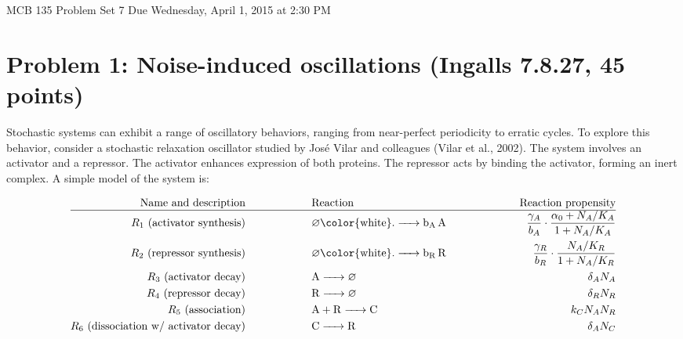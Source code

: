 \documentclass{article}
\begin{document}
\large

MCB 135 Problem Set 7 \hfill Due Wednesday, April 1, 2015 at 2:30 PM

\section*{Problem 1: Noise-induced oscillations (Ingalls 7.8.27, 45 points)}

Stochastic systems can exhibit a range of oscillatory behaviors, ranging from near-perfect periodicity to erratic cycles. To explore this behavior, consider a stochastic relaxation oscillator studied by Jos\'{e} Vilar and colleagues (Vilar et al., 2002). The system involves an activator and a repressor. The activator enhances expression of both proteins. The repressor acts by binding the activator, forming an inert complex. A simple model of the system is:

\begin{eqnarray*}
\textrm{ Name and description } \hspace{2 cm} & \textrm{Reaction} & \hspace{2 cm} \textrm{Reaction propensity}\\ \hline
R_1 \textrm{ (activator synthesis) } \hspace{2 cm} & \ce{\varnothing {\color{white}.} -> b_A A} & \hspace{2 cm} \frac{\gamma_A}{b_A} \cdot \frac{\alpha_0 + N_A/K_A}{1 + N_A/K_A}\\
R_2 \textrm{ (repressor synthesis) } \hspace{2 cm} & \ce{\varnothing {\color{white}.} -> b_R R} & \hspace{2 cm} \frac{\gamma_R}{b_R} \cdot \frac{N_A/K_R}{1 + N_A/K_R}\\
R_3 \textrm{ (activator decay) } \hspace{2 cm} & \ce{A -> \varnothing} & \hspace{2 cm} \delta_A N_A \\
R_4 \textrm{ (repressor decay) } \hspace{2 cm} & \ce{R -> \varnothing} & \hspace{2 cm} \delta_R N_R \\
R_5 \textrm{ (association) } \hspace{2 cm} & \ce{A + R -> C} & \hspace{2 cm} k_C N_A N_R \\
R_6 \textrm{ (dissociation w/ activator decay) } \hspace{2 cm} & \ce{C -> R} & \hspace{2 cm} \delta_A N_C \\
\end{eqnarray*}
\end{document}
